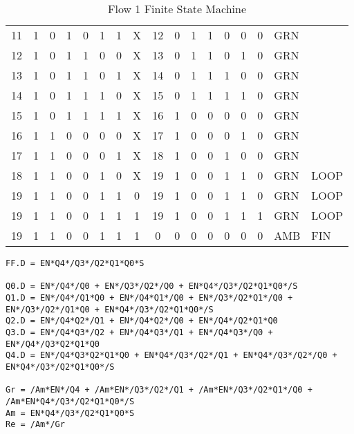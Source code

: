 \begin{table*}
\begin{tabularx}{\linewidth}{ c c c c c c c c | c c c c c c | c l l}
   11 &   1 &  0 &  1 &  0 &  1 &  1 & X      &  12 &  0 &  1 &  1 &  0 &  0             &   0 & GRN & \\
   12 &   1 &  0 &  1 &  1 &  0 &  0 & X      &  13 &  0 &  1 &  1 &  0 &  1             &   0 & GRN & \\
   13 &   1 &  0 &  1 &  1 &  0 &  1 & X      &  14 &  0 &  1 &  1 &  1 &  0             &   0 & GRN & \\
   14 &   1 &  0 &  1 &  1 &  1 &  0 & X      &  15 &  0 &  1 &  1 &  1 &  1             &   0 & GRN & \\
   15 &   1 &  0 &  1 &  1 &  1 &  1 & X      &  16 &  1 &  0 &  0 &  0 &  0             &   0 & GRN & \\
   16 &   1 &  1 &  0 &  0 &  0 &  0 & X      &  17 &  1 &  0 &  0 &  0 &  1             &   0 & GRN & \\
   17 &   1 &  1 &  0 &  0 &  0 &  1 & X      &  18 &  1 &  0 &  0 &  1 &  0             &   0 & GRN & \\
   18 &   1 &  1 &  0 &  0 &  1 &  0 & X      &  19 &  1 &  0 &  0 &  1 &  1             &   0 & GRN & LOOP \\
   19 &   1 &  1 &  0 &  0 &  1 &  1 & 0      &  19 &  1 &  0 &  0 &  1 &  1             &   0 & GRN & LOOP \\
   19 &   1 &  1 &  0 &  0 &  1 &  1 & 1      &  19 &  1 &  0 &  0 &  1 &  1             &   1 & GRN & LOOP \\
   19 &   1 &  1 &  0 &  0 &  1 &  1 & 1      &   0 &  0 &  0 &  0 &  0 &  0             &   0 & AMB & FIN \\
\end{tabularx}
\caption{Flow 1 Finite State Machine}
\label{tab:F1sm}
\end{table*}

\begin{lstlisting}
FF.D = EN*Q4*/Q3*/Q2*Q1*Q0*S

Q0.D = EN*/Q4*/Q0 + EN*/Q3*/Q2*/Q0 + EN*Q4*/Q3*/Q2*Q1*Q0*/S
Q1.D = EN*/Q4*/Q1*Q0 + EN*/Q4*Q1*/Q0 + EN*/Q3*/Q2*Q1*/Q0 + EN*/Q3*/Q2*/Q1*Q0 + EN*Q4*/Q3*/Q2*Q1*Q0*/S
Q2.D = EN*/Q4*Q2*/Q1 + EN*/Q4*Q2*/Q0 + EN*/Q4*/Q2*Q1*Q0
Q3.D = EN*/Q4*Q3*/Q2 + EN*/Q4*Q3*/Q1 + EN*/Q4*Q3*/Q0 + EN*/Q4*/Q3*Q2*Q1*Q0
Q4.D = EN*/Q4*Q3*Q2*Q1*Q0 + EN*Q4*/Q3*/Q2*/Q1 + EN*Q4*/Q3*/Q2*/Q0 + EN*Q4*/Q3*/Q2*Q1*Q0*/S

Gr = /Am*EN*/Q4 + /Am*EN*/Q3*/Q2*/Q1 + /Am*EN*/Q3*/Q2*Q1*/Q0 + /Am*EN*Q4*/Q3*/Q2*Q1*Q0*/S
Am = EN*Q4*/Q3*/Q2*Q1*Q0*S
Re = /Am*/Gr
\end{lstlisting}

